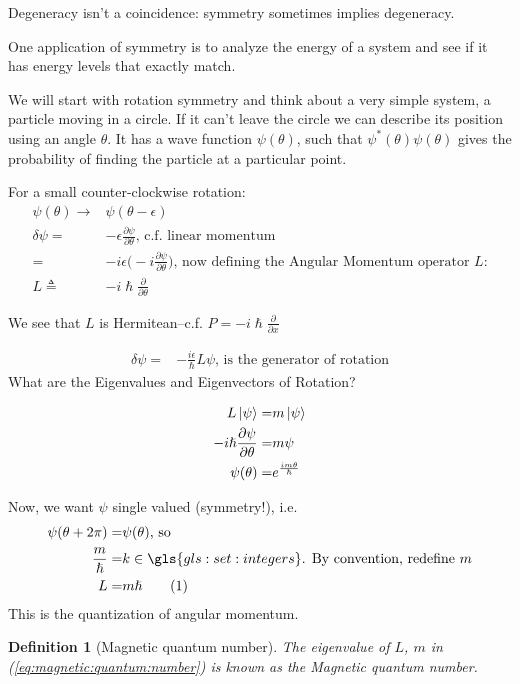 \documentclass[]{article}
\newcommand\numberthis{\addtocounter{equation}{1}\tag{\theequation}}
\newtheorem{defn}[thm]{Definition}
\begin{document}
Degeneracy isn't a coincidence: symmetry sometimes implies degeneracy.

One application of symmetry is to analyze the energy of a system and see if it has energy levels that exactly match.

We will start with rotation symmetry and think about a very simple system, a particle moving in a circle. If it can't leave the circle we can describe its position using an angle $\theta$. It has a wave function $\psi(\theta)$, such that $\psi^*(\theta)\psi(\theta)$ gives the probability of finding the particle at a particular point.

For a small counter-clockwise rotation:
\begin{align*}
\psi(\theta) \rightarrow & \psi(\theta - \epsilon)\\
\delta\psi =& - \epsilon \frac{\partial \psi}{\partial \theta} \text{, c.f. linear momentum}\\
=& -i \epsilon \big(-i \frac{\partial \psi}{\partial \theta}\big) \text{, now defining the Angular Momentum operator $L$:}\\
	L \triangleq& - i  \hslash \frac{\partial}{\partial \theta} 
\end{align*}

We see that $L$ is Hermitean--c.f. $P=-i\hslash \frac{\partial}{\partial x}$

\begin{align}
	\delta\psi =& - \frac{i \epsilon}{\hslash} L \psi \text{, is the generator of rotation}
\end{align}
What are the Eigenvalues and Eigenvectors of Rotation?

\begin{align*}
	L\ket{\psi} =& m \ket{\psi}\\
	-i \hslash \frac{\partial \psi}{\partial \theta} =& m \psi\\
	\psi(\theta) =& e^{\frac{i m \theta}{\hslash}}
\end{align*}

Now, we want $\psi$ single valued (symmetry!), i.e.
\begin{align*}
	\psi(\theta + 2\pi) =& \psi(\theta) \text{, so}\\
	\frac{m}{\hslash}=&k\in  \gls{gls:set:integers} \text{.  By convention, redefine $m$}\\
	L=& m \hslash \numberthis \label{eq:magnetic:quantum:number}
\end{align*}
This is the quantization of angular momentum.

\begin{defn}[Magnetic quantum number]
	The eigenvalue of $L$, $m$ in (\ref{eq:magnetic:quantum:number}) is known as the Magnetic quantum number.
\end{defn}
\end{document}
